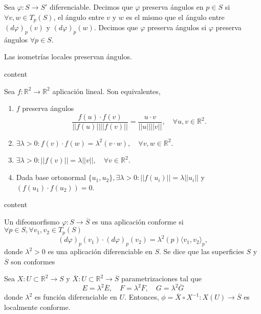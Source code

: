 \begin{defn}
  Sea $\varphi : S \to S'$ diferenciable. Decimos que $\varphi$ preserva ángulos en $p \in S$ si $\forall v, w \in T_{p}(S)$, el ángulo entre $v$ y $w$ es el mismo que el ángulo entre $(d \varphi)_{p}(v)$ y $(d \varphi)_{p}(w)$. Decimos que $\varphi$ preserva ángulos si $\varphi$ preserva ángulos $\forall p \in S$.
\end{defn}

\begin{prop}
  Las isometrías locales preservan ángulos.
\end{prop}

\begin{dem}
  content
\end{dem}

\begin{prop}
  Sea $f : \mathbb{R}^{2} \to \mathbb{R}^{2}$ aplicación lineal. Son equivalentes,
  \begin{enumerate}[label=(\roman*)]
    \item $f$ preserva ángulos
      \[ 
        \frac{f(u) \cdot f(v)}{||f(u)|| ||f(v)||} = \frac{u \cdot v}{||u|| ||v||}, \quad \forall u, v \in \mathbb{R}^{2}.
      \] 
    \item $\exists \lambda > 0 : f(v) \cdot f(w) = \lambda^{2} (v \cdot w), \quad \forall v, w \in \mathbb{R}^{2}$.
    \item $\exists \lambda > 0 : || f(v)|| = \lambda ||v||, \quad \forall v \in \mathbb{R}^{2}$.
    \item Dada base ortonormal $\{ u_{1}, u_{2} \}, \exists \lambda > 0 : ||f(u_{i})|| = \lambda ||u_{i}||$ y $(f(u_{1}) \cdot f(u_{2})) = 0$.
  \end{enumerate}
\end{prop}

\begin{dem}
  content
\end{dem}

\begin{defn}
  Un difeomorfismo $\varphi : S \to \overline{S}$ es una aplicación conforme si $\forall p \in S, \forall v_{1}, v_{2} \in T_{p}(S)$ 
  \[ 
    (d \varphi)_{p}(v_{1}) \cdot (d \varphi)_{p}(v_{2}) = \lambda^{2}(p) \langle v_{1}{ , }v_{2} \rangle_{p},
  \] 
  donde $\lambda^{2}> 0$ es una aplicación diferenciable en $S$. Se dice que las superficies $S$ y $\overline{S}$ son conformes
\end{defn}

\begin{prop}
  Sea $X : U \subset \mathbb{R}^{2} \to S$ y $\overline{X} : U \subset \mathbb{R}^{2} \to \overline{S}$ parametrizaciones tal que
  \[ 
    E = \lambda^{2} \overline{E}, \quad F = \lambda^{2} \overline{F}, \quad G = \lambda^{2} \overline{G}
  \] 
  donde $\lambda^{2}$ es función diferenciable en $U$. Entonces, $\phi = \overline{X} \circ X^{-1} : X(U) \to \overline{S}$ es localmente conforme.
\end{prop}

